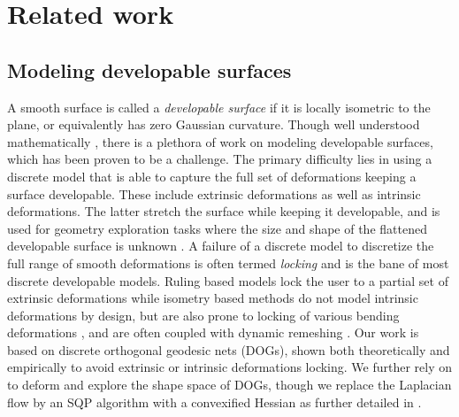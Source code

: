 \section{Related work}
\subsection{Modeling developable surfaces}
A smooth surface is called a \textit{developable surface} if it is locally isometric to the plane, or equivalently has zero Gaussian curvature. Though well understood mathematically \cite{do_carmo,spivak,computational_line}, there is a plethora of work on modeling developable surfaces, which has been proven to be a challenge. The primary difficulty lies in using a discrete model that is able to capture the full set of deformations keeping a surface developable. These include extrinsic deformations as well as intrinsic deformations. The latter stretch the surface while keeping it developable, and is used for geometry exploration tasks where the size and shape of the flattened developable surface is unknown \cite{conical,pottmann_new,rabi2018shape}. A failure of a discrete model to discretize the full range of smooth deformations is often termed \textit{locking} \cite{solomon,locking1} and is the bane of most discrete developable models. Ruling based models \cite{conical,curved_folding_kilian,pottmann_new,stein_dev,solomon} lock the user to a partial set of extrinsic deformations while isometry based methods \cite{grin_shells,shells, goldenthal2007efficient,froh_botsch} do not model intrinsic deformations by design, but are also prone to locking of various bending deformations \cite{locking1,locking2}, and are often coupled with dynamic remeshing \cite{narain2012adaptive,StringActuated:2017,Narain,SchreckEG2017}.  Our work is based on discrete orthogonal geodesic nets \cite{rabi18} (DOGs), shown both theoretically and empirically to avoid extrinsic or intrinsic deformations locking. We further rely on \cite{rabi2018shape} to deform and explore the shape space of DOGs, though we replace the Laplacian flow by an SQP algorithm with a convexified Hessian as further detailed in .
